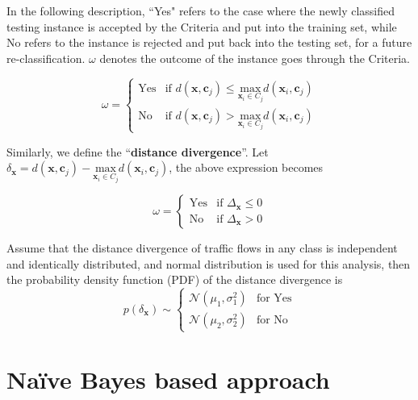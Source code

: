 \documentclass[10pt]{article}
\newcommand{\x}{\textbf{x}}
\newcommand{\cc}{\textbf{c}}
\begin{document}
In the following description, ``Yes" refers to the case where the newly classified testing instance is accepted by the Criteria and put into the training set, while No refers to the instance is rejected and put back into the testing set, for a future re-classification. $\omega$ denotes the outcome of the instance goes through the Criteria.

\[
\omega = \begin{cases} \text{Yes} &\mbox{if  }  d(\x,\cc_j) \leq \underset{\x_i\in C_j}{\text{max}}d(\x_i,\cc_j)\\
\text{No} &\mbox{if }  d(\x,\cc_j) > \underset{\x_i\in C_j}{\text{max}}d(\x_i,\cc_j)\end{cases}
\]

Similarly, we define the ``\textbf{distance divergence}''. Let $\delta_{\x}=d(\x,\cc_j)-\underset{\x_i\in C_j}{\text{max}}d(\x_i,\cc_j)$, the above expression becomes

\[
\omega = \begin{cases} \text{Yes} & \text{if  }  \Delta_{\x}\leq 0\\
\text{No} &\text{if } \Delta_{\x} > 0 \end{cases}
\] 

Assume that the distance divergence of traffic flows in any class is independent and identically distributed, and normal distribution is used for this analysis, then the probability density function (PDF) of the distance divergence is 
\[
p(\delta_{\x})  \sim \begin{cases} \mathcal{N}(\mu_1,\sigma^2_1) &\text{for Yes}\\
\mathcal{N}(\mu_2,\sigma^2_2)  &\text{for No}\end{cases}
\]


\section{Na\"{i}ve Bayes based approach}


\end{document}
